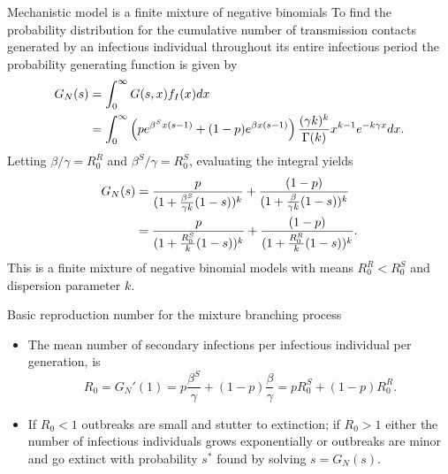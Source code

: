 \documentclass[
  ignorenonframetext,
]{beamer}
\begin{document}
\begin{frame}{Mechanistic model is a finite mixture of negative
binomials}
\protect\hypertarget{mechanistic-model-is-a-finite-mixture-of-negative-binomials}{}
To find the probability distribution for the cumulative number of
transmission contacts generated by an infectious individual throughout
its entire infectious period the probability generating function is
given by \begin{align*}
    G_N(s) &= \int_0^{\infty} G(s,x) f_I(x) dx \notag \\ &= \int_0^\infty \left (p e^{\beta^S x (s-1)}+(1-p)e^{\beta x (s-1)} \right) \frac{(\gamma k)^k}{\Gamma(k)} x^{k-1}e^{-k \gamma x} dx.
\end{align*} Letting \(\beta /\gamma = R_0^R\) and
\(\beta^S /\gamma = R_0^S\), evaluating the integral yields
\begin{align*}
    G_N(s) &=  \frac{p}{(1 + \frac{\beta^S}{\gamma k}(1-s))^k} +   \frac{(1-p)}{(1 + \frac{\beta}{\gamma k}(1-s))^k} \notag \\&=  \frac{p}{(1 + \frac{R_0^S}{k}(1-s))^k} +   \frac{(1-p)}{(1 + \frac{R_0^R}{k}(1-s))^k}. 
\end{align*} This is a finite mixture of negative binomial models with
means \(R_0^R<R_0^S\) and dispersion parameter \(k\).
\end{frame}

\begin{frame}{Basic reproduction number for the mixture branching
process}
\protect\hypertarget{basic-reproduction-number-for-the-mixture-branching-process}{}
\begin{itemize}
\item
  The mean number of secondary infections per infectious individual per
  generation, is\\
  \begin{equation*}\label{eqn:R0}
   R_0= G_N'(1) = p\frac{ \beta^S }{\gamma } +(1-p)\frac{ \beta }  {\gamma  } = p R_0^S + (1-p) R_0^R.
  \end{equation*}
\item
  If \(R_0<1\) outbreaks are small and stutter to extinction; if
  \(R_0>1\) either the number of infectious individuals grows
  exponentially or outbreaks are minor and go extinct with probability
  \(s^*\) found by solving \(s=G_N(s)\).
\end{itemize}
\end{frame}
\end{document}
